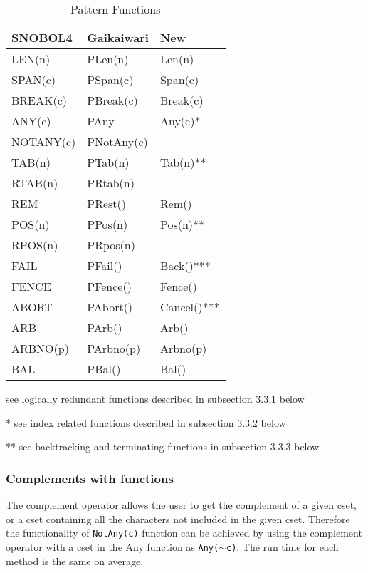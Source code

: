 \documentclass{article}
\begin{document}
\begin{table}[ht]
	\begin{threeparttable}
		\caption{Pattern Functions}
		\centering
		\begin{tabular}{|l|l|l|}
			\hline\hline
			SNOBOL4 & Gaikaiwari & New \\
			\hline
			LEN(n) & PLen(n) & Len(n) \\
			SPAN(c) & PSpan(c) & Span(c)  \\
			BREAK(c) & PBreak(c) & Break(c) \\
			ANY(c) & PAny & Any(c)* \\
			NOTANY(c) & PNotAny(c) &  \\
			TAB(n) & PTab(n) & Tab(n)** \\
			RTAB(n) & PRtab(n) &  \\
			REM & PRest() & Rem() \\
			POS(n) & PPos(n) & Pos(n)**  \\
			RPOS(n) & PRpos(n) &  \\
			FAIL & PFail() & Back()*** \\
			FENCE & PFence() & Fence() \\
			ABORT & PAbort() & Cancel()*** \\
			ARB & PArb() & Arb() \\
			ARBNO(p) & PArbno(p) & Arbno(p) \\
			BAL & PBal() & Bal() \\
			\hline
		\end{tabular}
		
		\begin{tablenotes}
      		\small
      		\item * see logically redundant functions described in subsection 3.3.1 below
      		\item ** see index related functions described in subsection 3.3.2 below
      		\item *** see backtracking and terminating functions in subsection 3.3.3 below
      	\end{tablenotes}
	\end{threeparttable}
\end{table}


\vspace{1 pc}
\subsubsection{Complements with functions}
The complement operator allows the user to get the complement of a given cset, or a cset containing all the characters not included in the given cset.  Therefore the functionality of \texttt{NotAny(c)} function can be achieved by using the complement operator with a cset in the Any function as \texttt{Any($\sim$c)}.  The run time for each method is the same on average.
\end{document}
